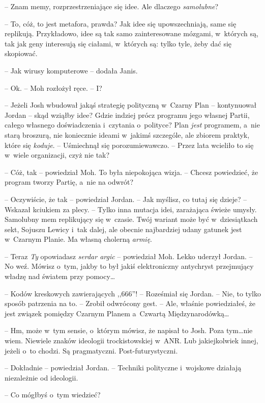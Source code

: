 \documentclass[oneside,polish,11pt,sfheadings]{mwbk}
\begin{document}
-- Znam memy, rozprzestrzeniające się idee. Ale dlaczego
\emph{samolubne}?

-- To, cóż, to jest metafora, prawda? Jak idee się upowszechniają, same
się replikują. Przykładowo, idee są tak samo zainteresowane mózgami, w~których są, tak jak geny interesują się ciałami, w~których są: tylko
tyle, żeby dać się skopiować.

-- Jak wirusy komputerowe -- dodała Janis.

-- Ok. -- Moh rozłożył ręce. -- I?

-- Jeżeli Josh wbudował jakąś strategię polityczną w~Czarny Plan -- kontynuował Jordan -- skąd wziąłby idee? Gdzie indziej prócz programu
jego własnej Partii, całego własnego doświadczenia i~czytania o~polityce? Plan \emph{jest} programem, a~nie starą broszurą, nie
koniecznie ideami w~jakimś szczególe, ale zbiorem praktyk, które się
\emph{koduje}. -- Uśmiechnął się porozumiewawczo. -- Przez lata wcieliło
to się w~wiele organizacji, czyż nie tak?

-- Cóż, tak -- powiedział Moh. To była niepokojąca wizja. -- Chcesz
powiedzieć, że program tworzy Partię, a~nie na odwrót?

-- Oczywiście, że tak -- powiedział Jordan. -- Jak myślisz, co tutaj się
dzieje? -- Wskazał kciukiem za plecy. -- Tylko inna mutacja idei,
zarażająca świeże umysły. Samolubny mem replikujący się w~czasie. Twój
wariant może być w~dziesiątkach sekt, Sojuszu Lewicy i~tak dalej, ale
obecnie najbardziej udany gatunek jest w~Czarnym Planie. Ma własną
cholerną \emph{armię}.

-- Teraz \emph{Ty} opowiadasz \emph{serdar argic} -- powiedział Moh. Lekko
uderzył Jordan. -- No weź. Mówisz o~tym, jakby to był jakiś elektroniczny
antychryst przejmujący władzę nad światem przy pomocy\ldots

-- Kodów kreskowych zawierających ,,666''! -- Roześmiał się Jordan. -- Nie,
to tylko sposób patrzenia na to. -- Zrobił odwrócony gest. -- Ale, właśnie
powiedziałeś, że jest związek pomiędzy Czarnym Planem a~Czwartą
Międzynarodówką\ldots

-- Hm, może w~tym sensie, o~którym mówisz, że napisał to Josh. Poza
tym\ldots nie wiem. Niewiele znaków ideologii trockistowskiej w~ANR. Lub
jakiejkolwiek innej, jeżeli o~to chodzi. Są pragmatyczni.
Post-futurystyczni.

-- Dokładnie -- powiedział Jordan. -- Techniki polityczne i~wojskowe
działają niezależnie od ideologii.

-- Co mógłbyś o~tym wiedzieć?
\end{document}
